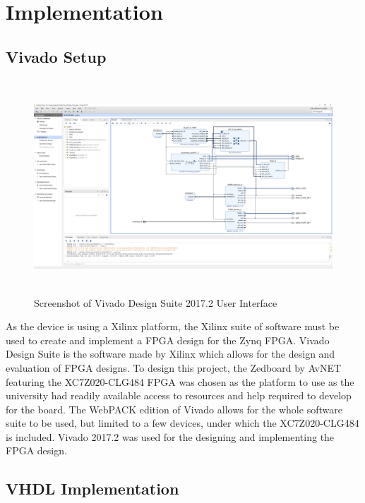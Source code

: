 \chapter{Implementation}\label{C:impl}

\section{Vivado Setup}

\begin{figure}[H]
    \begin{center}
        \includegraphics[height=8cm,keepaspectratio]{Images/Vivado.png}
        \caption{Screenshot of Vivado Design Suite 2017.2 User Interface}
        \label{fig:vivado}
    \end{center}
\end{figure}

As the device is using a Xilinx platform, the Xilinx suite of software must be used to create and implement a FPGA 
design for the Zynq FPGA. Vivado Design Suite is the software made by Xilinx which allows for the design and 
evaluation of FPGA designs. To design this project, the Zedboard by AvNET featuring the XC7Z020-CLG484 FPGA was 
chosen as the platform to use as the university had readily available access to resources and help required to 
develop for the board. The WebPACK edition of Vivado allows for the whole software suite to be used, but limited to 
a few devices, under which the XC7Z020-CLG484 is included. Vivado 2017.2 was used for the designing and implementing 
the FPGA design.

\section{VHDL Implementation}

